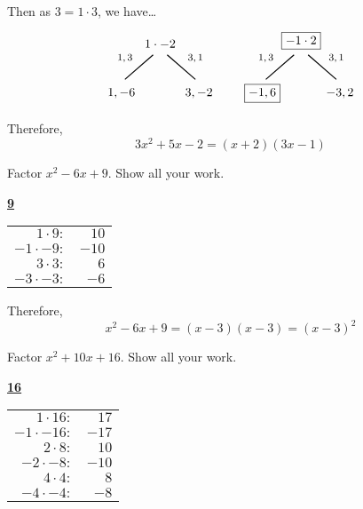 \documentclass[11pt,letterpaper]{article}
\begin{document}
Then as $3= 1 \cdot 3$, we have\dots
	\[
	\begin{tikzpicture}
	\node at (0,0) {$1 \cdot -2$};
	\node at (-1.0,-0.4) {\footnotesize$1, 3$};
	\draw[line width=0.03cm,label={1}] (-0.2,-0.3) -- (-1,-1);
	\node at (-1.1,-1.4) {$1, -6$};
	\node at (1.0,-0.4) {\footnotesize$3,1$};
	\draw[line width=0.03cm] (0.2,-0.3) -- (1,-1);
	\node at (1.1,-1.4) {$3, -2$};	
	
	\tikzset{shift={(4,0)}}

	\node at (0,0.1) {\framebox{$-1 \cdot 2$}};
	\node at (-1.0,-0.4) {\footnotesize$1, 3$};
	\draw[line width=0.03cm,label={1}] (-0.2,-0.3) -- (-1,-1);
	\node at (-1.1,-1.4) {\framebox{$-1, 6$}};
	\node at (1.0,-0.4) {\footnotesize$3,1$};
	\draw[line width=0.03cm] (0.2,-0.3) -- (1,-1);
	\node at (1.1,-1.4) {$-3, 2$};
	\end{tikzpicture}
	\]

Therefore, 
	\[
	3x^2 + 5x - 2= (x + 2)(3x - 1)
	\]





\newpage





 Factor $x^2 - 6x + 9$. Show all your work. \pspace

\sol 
	\begin{table}[!ht]
	\centering
	\underline{\bfseries 9} \pvspace{0.1cm}
	\begin{tabular}{rr}
	$1 \cdot 9 \colon$ & $10$ \\
	$-1 \cdot -9 \colon$ & $-10$ \\
	$3 \cdot 3 \colon$ & $6$ \\ \hline
	\multicolumn{1}{|r}{$-3 \cdot -3 \colon$} & \multicolumn{1}{r|}{$-6$} \\ \hline
	\end{tabular}
	\end{table}

Therefore,
	\[
	x^2 - 6x + 9= (x - 3)(x - 3)= (x - 3)^2
	\]





\newpage





 Factor $x^2 + 10x + 16$. Show all your work. \pspace

\sol 
	\begin{table}[!ht]
	\centering
	\underline{\bfseries 16} \pvspace{0.1cm}
	\begin{tabular}{rr}
	$1 \cdot 16 \colon$ & $17$ \\
	$-1 \cdot -16 \colon$ & $-17$ \\ \hline
	\multicolumn{1}{|r}{$2 \cdot 8 \colon$} & \multicolumn{1}{r|}{$10$} \\ \hline
	$-2 \cdot -8 \colon$ & $-10$ \\
	$4 \cdot 4 \colon$ & $8$ \\
	$-4 \cdot -4 \colon$ & $-8$ \\
	\end{tabular}
	\end{table}
\end{document}
